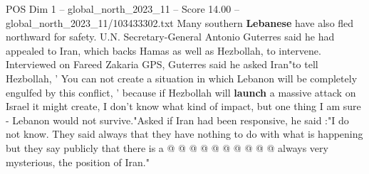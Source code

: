 \begin{textsample}{POS Dim 1 – global\_north\_2023\_11 – Score 14.00 – global\_north\_2023\_11/103433302.txt}
Many southern \textbf{Lebanese} have also fled northward for safety.
U.N.
Secretary-General Antonio Guterres said he had appealed to Iran, which backs Hamas as well as Hezbollah, to intervene.
Interviewed on Fareed Zakaria GPS, Guterres said he asked Iran"to tell Hezbollah, ' You can not create a situation in which Lebanon will be completely engulfed by this conflict, ' because if Hezbollah will \textbf{launch} a massive attack on Israel it might create, I don't know what kind of impact, but one thing I am sure - Lebanon would not survive."Asked if Iran had been responsive, he said :"I do not know.
They said always that they have nothing to do with what is happening but they say publicly that there is a @ @ @ @ @ @ @ @ @ @ always very mysterious, the position of Iran."

\end{textsample}
